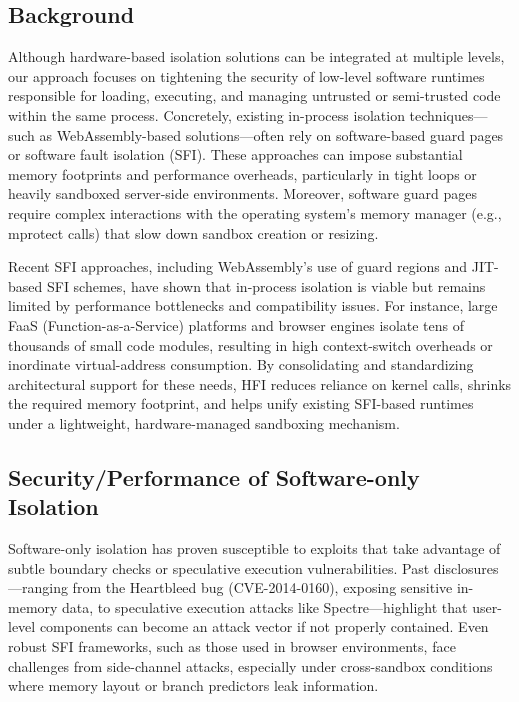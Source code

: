 \documentclass[conference,compsoc]{IEEEtran}
\begin{document}
\subsection{Background}
Although hardware-based isolation solutions can be integrated at multiple levels, our approach focuses on tightening the security of low-level software runtimes responsible for loading, executing, and managing untrusted or semi-trusted code within the same process. Concretely, existing in-process isolation techniques—such as WebAssembly-based solutions—often rely on software-based guard pages or software fault isolation (SFI). These approaches can impose substantial memory footprints and performance overheads, particularly in tight loops or heavily sandboxed server-side environments. Moreover, software guard pages require complex interactions with the operating system's memory manager (e.g., mprotect calls) that slow down sandbox creation or resizing.

Recent SFI approaches, including WebAssembly's use of guard regions and JIT-based SFI schemes, have shown that in-process isolation is viable but remains limited by performance bottlenecks and compatibility issues. For instance, large FaaS (Function-as-a-Service) platforms and browser engines isolate tens of thousands of small code modules, resulting in high context-switch overheads or inordinate virtual-address consumption. By consolidating and standardizing architectural support for these needs, HFI reduces reliance on kernel calls, shrinks the required memory footprint, and helps unify existing SFI-based runtimes under a lightweight, hardware-managed sandboxing mechanism.


\subsection{Security/Performance of Software-only Isolation}
Software-only isolation has proven susceptible to exploits that take advantage of subtle boundary checks or speculative execution vulnerabilities. Past disclosures—ranging from the Heartbleed bug (CVE-2014-0160), exposing sensitive in-memory data, to speculative execution attacks like Spectre—highlight that user-level components can become an attack vector if not properly contained. Even robust SFI frameworks, such as those used in browser environments, face challenges from side-channel attacks, especially under cross-sandbox conditions where memory layout or branch predictors leak information.
\end{document}
